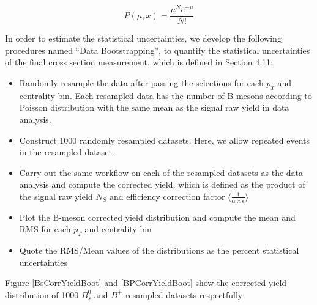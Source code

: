 \begin{equation}
P(\mu,x) = \frac{\mu^N e^{-\mu}}{N!}
\end{equation}

In order to estimate the statistical uncertainties, we develop the following procedures named ``Data Bootstrapping'', to quantify the statistical uncertainties of the final cross section measurement, which is defined in Section 4.11:

\begin{itemize}
\item Randomly resample the data after passing the selections for each $p_T$ and centrality bin. Each resampled data has the number of B mesons according to Poisson distribution with the same mean as the signal raw yield in data analysis.
\item Construct 1000 randomly resampled datasets. Here, we allow repeated events in the resampled dataset.
\item Carry out the same workflow on each of the resampled datasets as the data analysis and compute the corrected yield, which is defined as the product of the signal raw yield $N_S$ and efficiency correction factor $\langle \frac{1}{\alpha \times \epsilon}\rangle$
\item Plot the B-meson corrected yield distribution and compute the mean and RMS for each $p_T$ and centrality bin
\item Quote the RMS/Mean values of the distributions as the percent statistical uncertainties
\end{itemize}

Figure \ref{BsCorrYieldBoot} and \ref{BPCorrYieldBoot} show the corrected yield distribution of 1000 $B^0_s$ and $B^+$ resampled datasets respectfully



